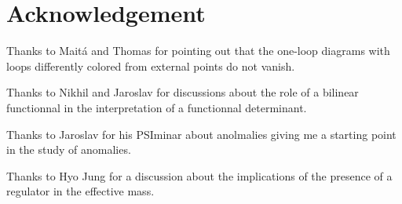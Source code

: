\documentclass[10pt, a4paper]{article}
\begin{document}
\section{Acknowledgement}

Thanks to Maitá and Thomas for pointing out that the one-loop diagrams with loops differently colored from external points do not vanish. 

Thanks to Nikhil and Jaroslav for discussions about the role of a bilinear functionnal in the interpretation of a functionnal determinant. 

Thanks to Jaroslav for his PSIminar about anolmalies giving me a starting point in the study of anomalies. 

Thanks to Hyo Jung for a discussion about the implications of the presence of a regulator in the effective mass. 




\makereferences


\end{document}
